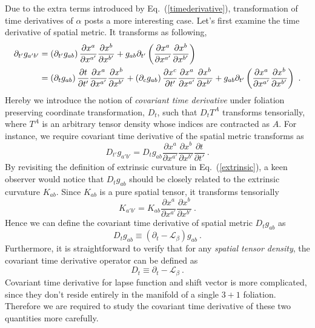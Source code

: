 Due to the extra terms introduced by Eq.~(\ref{timederivative}), transformation of time derivatives of $\alpha$ posts a more interesting case. Let's first examine the time derivative of spatial metric. It transforms as following, 
\begin{align}
\partial_{t'}g_{a'b'} & = \left(\partial_{t'}g_{ab}\right)\frac{\partial x^{a}}{\partial x^{a'}}\frac{\partial x^{b}}{\partial x^{b'}} + g_{ab}\partial_{t'}\left(\frac{\partial x^{a}}{\partial x^{a'}}\frac{\partial x^{b}}{\partial x^{b'}}\right)\notag\\
& =  \left(\partial_{t}g_{ab}\right)\frac{\partial t}{\partial t'}\frac{\partial x^{a}}{\partial x^{a'}}\frac{\partial x^{b}}{\partial x^{b'}} + \left(\partial_{c}g_{ab}\right)\frac{\partial x^{c}}{\partial t'}\frac{\partial x^{a}}{\partial x^{a'}}\frac{\partial x^{b}}{\partial x^{b'}} + g_{ab}\partial_{t'}\left(\frac{\partial x^{a}}{\partial x^{a'}}\frac{\partial x^{b}}{\partial x^{b'}}\right) \ .
\end{align}
Hereby we introduce the notion of {\em covariant time derivative} under foliation preserving coordinate transformation, $D_{t}$, such that $D_{t}T^{A}$ transforms tensorially, where $T^{A}$ is an arbitrary tensor density whose indices are contracted as $A$. For instance, we require covariant time derivative of the spatial metric transforms as
\begin{equation}
	D_{t'}g_{a'b'} = D_{t}g_{ab}\frac{\partial x^{a}}{\partial x^{a'}}\frac{\partial x^{b}}{\partial x^{b'}}\frac{\partial t}{\partial t'} \ .
\end{equation}
By revisiting the definition of extrinsic curvature in Eq.~(\ref{extrinsic}), a keen observer would notice that $D_{t}g_{ab}$ should be closely related to the extrinsic curvature $K_{ab}$. Since $K_{ab}$ is a pure spatial tensor, it transforms tensorially
\begin{equation}
	K_{a'b'} = K_{ab}\frac{\partial x^{a}}{\partial x^{a'}}\frac{\partial x^{b}}{\partial x^{b'}} \ .
\end{equation}
Hence we can define the covariant time derivative of spatial metric $D_{t}g_{ab}$ as
\begin{equation}
	D_{t}g_{ab} \equiv (\partial_{t} - \mathcal{L}_{\beta})g_{ab} \ .
\end{equation}
Furthermore, it is straightforward to verify that for any {\em spatial tensor density}, the covariant time derivative operator can be defined as
\begin{equation}
	D_{t} \equiv \partial_{t} - \mathcal{L}_{\beta} \ .
\end{equation}
Covariant time derivative for lapse function and shift vector is more complicated, since they don't reside entirely in the manifold of a single $3 + 1$ foliation. Therefore we are required to study the covariant time derivative of these two quantities more carefully. 

